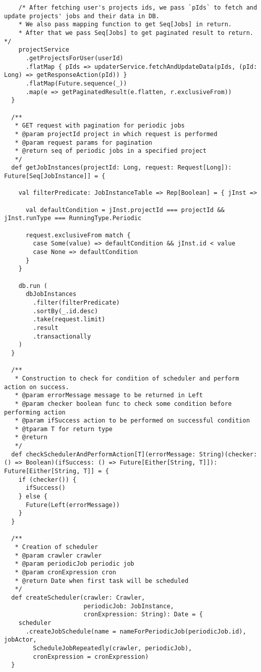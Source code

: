 \begin{lstlisting}
    /* After fetching user's projects ids, we pass `pIds` to fetch and update projects' jobs and their data in DB.
    * We also pass mapping function to get Seq[Jobs] in return.
    * After that we pass Seq[Jobs] to get paginated result to return.  */
    projectService
      .getProjectsForUser(userId)
      .flatMap { pIds => updaterService.fetchAndUpdateData(pIds, (pId: Long) => getResponseAction(pId)) }
      .flatMap(Future.sequence(_))
      .map(e => getPaginatedResult(e.flatten, r.exclusiveFrom))
  }

  /**
   * GET request with pagination for periodic jobs
   * @param projectId project in which request is performed
   * @param request params for pagination
   * @return seq of periodic jobs in a specified project
   */
  def getJobInstances(projectId: Long, request: Request[Long]): Future[Seq[JobInstance]] = {

    val filterPredicate: JobInstanceTable => Rep[Boolean] = { jInst =>

      val defaultCondition = jInst.projectId === projectId && jInst.runType === RunningType.Periodic

      request.exclusiveFrom match {
        case Some(value) => defaultCondition && jInst.id < value
        case None => defaultCondition
      }
    }

    db.run (
      dbJobInstances
        .filter(filterPredicate)
        .sortBy(_.id.desc)
        .take(request.limit)
        .result
        .transactionally
    )
  }

  /**
   * Construction to check for condition of scheduler and perform action on success.
   * @param errorMessage message to be returned in Left
   * @param checker boolean func to check some condition before performing action
   * @param ifSuccess action to be performed on successful condition
   * @tparam T for return type
   * @return
   */
  def checkSchedulerAndPerformAction[T](errorMessage: String)(checker: () => Boolean)(ifSuccess: () => Future[Either[String, T]]): Future[Either[String, T]] = {
    if (checker()) {
      ifSuccess()
    } else {
      Future(Left(errorMessage))
    }
  }

  /**
   * Creation of scheduler
   * @param crawler crawler
   * @param periodicJob periodic job
   * @param cronExpression cron
   * @return Date when first task will be scheduled
   */
  def createScheduler(crawler: Crawler,
                      periodicJob: JobInstance,
                      cronExpression: String): Date = {
    scheduler
      .createJobSchedule(name = nameForPeriodicJob(periodicJob.id), jobActor,
        ScheduleJobRepeatedly(crawler, periodicJob),
        cronExpression = cronExpression)
  }


\end{lstlisting}
